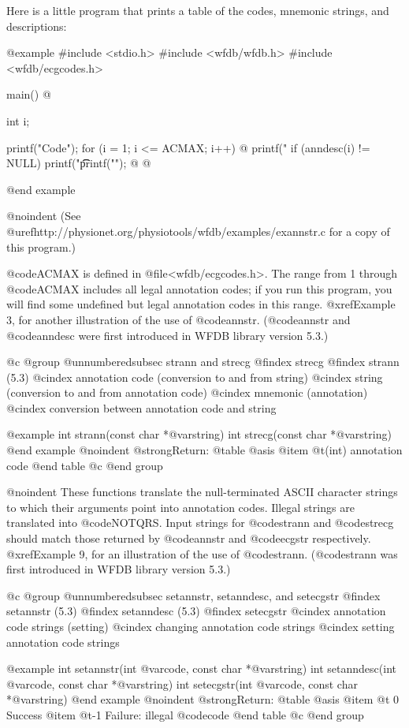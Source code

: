 {{{{{{{{Here is a little program that prints a table of the codes, mnemonic
strings, and descriptions:

@example
#include <stdio.h>
#include <wfdb/wfdb.h>
#include <wfdb/ecgcodes.h>

main()
@{
    int i;

    printf("Code\tMnemonic\tDescription\n");
    for (i = 1; i <= ACMAX; i++) @{
        printf("%
        if (anndesc(i) != NULL)
            printf("\t\t%
        printf("\n");
    @}
@}
@end example

@noindent
(See @uref{http://physionet.org/physiotools/wfdb/examples/exannstr.c}
for a copy of this program.)

@code{ACMAX} is defined in @file{<wfdb/ecgcodes.h>}.  The range from 1
through @code{ACMAX} includes all legal annotation codes; if you run
this program, you will find some undefined but legal annotation codes in
this range. @xref{Example 3}, for another illustration of the use of
@code{annstr}.  (@code{annstr} and @code{anndesc} were first introduced
in WFDB library version 5.3.)

@c @group
@unnumberedsubsec strann and strecg
@findex strecg
@findex strann (5.3)
@cindex annotation code (conversion to and from string)
@cindex string (conversion to and from annotation code)
@cindex mnemonic (annotation)
@cindex conversion between annotation code and string

@example
int strann(const char *@var{string})
int strecg(const char *@var{string})
@end example
@noindent
@strong{Return:}
@table @asis
@item @t{(int)}
annotation code
@end table
@c @end group

@noindent
These functions translate the null-terminated ASCII character strings to
which their arguments point into annotation codes.  Illegal strings are
translated into @code{NOTQRS}.  Input strings for @code{strann} and
@code{strecg} should match those returned by @code{annstr} and
@code{ecgstr} respectively.  @xref{Example 9}, for an illustration of the
use of @code{strann}. (@code{strann} was first introduced in WFDB library
version 5.3.)

@c @group
@unnumberedsubsec setannstr, setanndesc, and setecgstr
@findex setannstr (5.3)
@findex setanndesc (5.3)
@findex setecgstr
@cindex annotation code strings (setting)
@cindex changing annotation code strings
@cindex setting annotation code strings

@example
int setannstr(int @var{code}, const char *@var{string})
int setanndesc(int @var{code}, const char *@var{string})
int setecgstr(int @var{code}, const char *@var{string})
@end example
@noindent
@strong{Return:}
@table @asis
@item @t{ 0}
Success
@item @t{-1}
Failure: illegal @code{code}
@end table
@c @end group

}}}}}}}}
